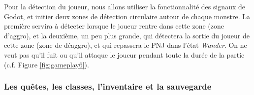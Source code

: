 Pour la détection du joueur, nous allons utiliser la fonctionnalité des signaux de Godot, et initier deux zones de détection circulaire autour de chaque monstre.
La première servira à détecter lorsque le joueur rentre dans cette zone (zone d'aggro), et la deuxième, un peu plus grande, qui détectera la sortie du joueur de cette zone (zone de déaggro), et qui repassera le PNJ dans l'état \textit{Wander}.
On ne veut pas qu'il fuit ou qu'il attaque le joueur pendant toute la durée de la partie (c.f. Figure \ref*{fig:gameplay6}).


\subsubsection*{Les quêtes, les classes, l'inventaire et la sauvegarde}